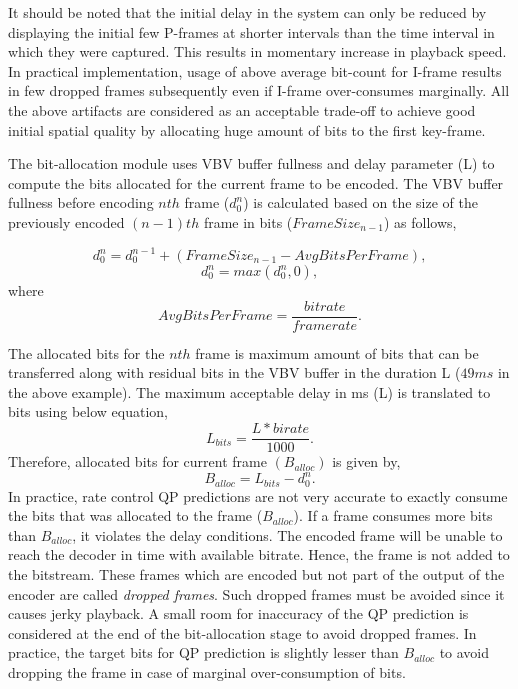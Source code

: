 \documentclass[11pt]{article} %
\begin{document}
It should be noted that the initial delay in the system can only be reduced by displaying the initial few P-frames at shorter intervals than the time interval in which they were captured. This results in momentary increase in playback speed. In practical implementation, usage of above average bit-count for I-frame results in few dropped frames subsequently even if I-frame over-consumes marginally. All the above artifacts are considered as an acceptable trade-off to achieve good initial spatial quality by allocating huge amount of bits to the first key-frame.

The bit-allocation module uses VBV buffer fullness and delay parameter (L) to compute the bits allocated for the current frame to be encoded. The VBV buffer fullness before encoding $nth$ frame ($d_0^{n}$) is calculated based on the size of the previously encoded $(n-1)th$ frame in bits ($FrameSize_{n-1}$) as follows,

$$ d_0^{n} = d_0^{n-1} + (FrameSize_{n-1} - AvgBitsPerFrame),$$
$$ d_0^{n} = max(d_0^{n} , 0), $$
where $$ AvgBitsPerFrame = \frac{bitrate}{framerate}.$$

The allocated bits for the $nth$ frame is maximum amount of bits that can be transferred along with residual bits in the VBV buffer in the duration L ($49ms$ in the above example). The maximum acceptable delay in ms (L) is translated to bits using below equation,
$$ L_{bits} = \frac{L * birate}{1000}.$$
Therefore, allocated bits for current frame $(B_{alloc})$ is given by,
\begin{equation}
	\label{Eq:bit-allocation}
	B_{alloc} = L_{bits} - d_0^n .
\end{equation}
In practice, rate control QP predictions are not very accurate to exactly consume the bits that was allocated to the frame ($B_{alloc}$). If a frame consumes more bits than $B_{alloc}$, it violates the delay conditions. The encoded frame will be unable to reach the decoder in time with available bitrate. Hence, the frame is not added to the bitstream. These frames which are encoded but not part of the output of the encoder are called \textit{dropped frames}. Such dropped frames must be avoided since it causes jerky playback. A small room for inaccuracy of the QP prediction is considered at the end of the bit-allocation stage to avoid dropped frames. In practice, the target bits for QP prediction is slightly lesser than $B_{alloc}$ to avoid dropping the frame in case of marginal over-consumption of bits.

\end{document}
